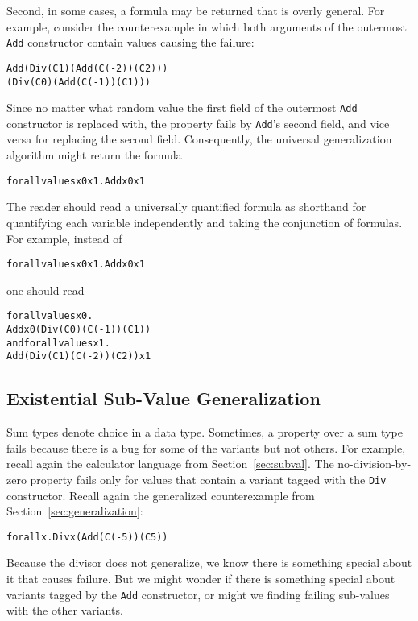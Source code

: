 \documentclass{sigplanconf}
\newenvironment{code}{\begin{alltt}\footnotesize}{\end{alltt}}
\newcommand{\ttp}[1]{\texttt{#1}}
\begin{document}
Second, in some cases, a formula may be returned that is overly general.  For
example, consider the counterexample in which both arguments of the outermost
\ttp{Add} constructor contain values causing the failure:
%
\begin{code}
Add (Div (C 1) (Add (C (-2)) (C 2)))
    (Div (C 0) (Add (C (-1)) (C 1)))
\end{code}
%
\noindent
Since no matter what random value the first field of the outermost \ttp{Add}
constructor is replaced with, the property fails by \ttp{Add}'s second field,
and vice versa for replacing the second field.  Consequently, the universal
generalization algorithm might return the formula
\noindent
%
\begin{code}
forall values x0 x1 . Add x0 x1
\end{code}
%
\noindent
The reader should read a universally quantified formula as shorthand for
quantifying each variable independently and taking the conjunction of formulas.
For example, instead of
%
\begin{code}
forall values x0 x1 . Add x0 x1
\end{code}
%
\noindent
one should read
%
%
\begin{code}
      forall values x0 .
        Add x0 (Div (C 0) (C (-1)) (C 1))
  and forall values x1 .
        Add (Div (C 1) (C (-2)) (C 2)) x1
\end{code}


\subsection{Existential Sub-Value Generalization}\label{sec:existential}

Sum types denote choice in a data type.  Sometimes, a property over a sum type
fails because there is a bug for some of the variants but not others.  For
example, recall again the calculator language from Section~\ref{sec:subval}.  The
no-division-by-zero property fails only for values that contain a variant tagged
with the \ttp{Div} constructor.  Recall again the generalized counterexample
from Section~\ref{sec:generalization}:
%
\begin{code}
forall x . Div x (Add (C (-5)) (C 5))
\end{code}
%
\noindent
Because the divisor does not generalize, we know there is something special
about it that causes failure.  But we might wonder if there is something special
about variants tagged by the \ttp{Add} constructor, or might we finding failing
sub-values with the other variants.
\end{document}
